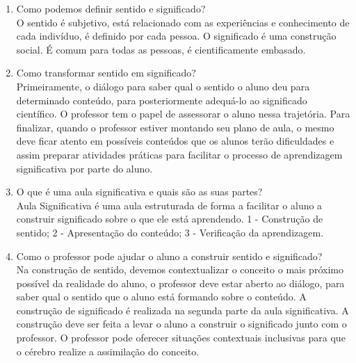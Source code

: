 \documentclass[a4paper, 12pt]{article}
\begin{document}
\begin{enumerate}
\begin{enumerate}
  \item Como podemos definir sentido e significado? \\
    O sentido é subjetivo, está relacionado com as experiências e conhecimento de cada indivíduo, é definido por cada pessoa. O significado é uma construção social. É comum para todas as pessoas, é cientificamente embasado.
  \item Como transformar sentido em significado? \\
    Primeiramente, o diálogo para saber qual o sentido o aluno deu para determinado conteúdo, para posteriormente adequá-lo ao significado científico. O professor tem o papel de assessorar o aluno nessa trajetória. Para finalizar, quando o professor estiver montando seu plano de aula, o mesmo deve ficar atento em possíveis conteúdos que os alunos terão dificuldades e assim preparar atividades práticas para facilitar o processo de aprendizagem significativa por parte do aluno.
  \item O que é uma aula significativa e quais são as suas partes? \\
    Aula Significativa é uma aula estruturada de forma a facilitar o aluno a construir significado sobre o que ele está aprendendo. 1 - Construção de sentido; 2 - Apresentação do conteúdo; 3 - Verificação da aprendizagem.
  \item Como o professor pode ajudar o aluno a construir sentido e significado? \\
    Na construção de sentido, devemos contextualizar o conceito o mais próximo possível da realidade do aluno, o professor deve estar aberto ao diálogo, para saber qual o sentido que o aluno está formando sobre o conteúdo. A construção de significado é realizada na segunda parte da aula significativa. A construção deve ser feita a levar o aluno a construir o significado junto com o professor. O professor pode oferecer situações contextuais inclusivas para que o cérebro realize a assimilação do conceito.
  \end{enumerate}


\end{enumerate}
\end{document}
